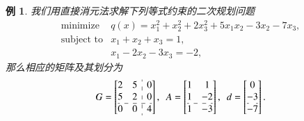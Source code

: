 \documentclass{SBCbookchapter}
\newtheorem{eg}[thm]{例}
\begin{document}
\begin{eg}
\label{eg:7.2.1}
我们用直接消元法求解下列等式约束的二次规划问题
\begin{equation*}
\begin{array}{cl}
\text{minimize} & q(x) = x_1^2 + x_2^2 + 2x_3^2 + 5x_1x_2 - 3x_2 - 7x_3, \\
\text{subject to} & x_1 + x_2 + x_3 = 1, \\
& x_1 - 2x_2 - 3x_3 = -2,
\end{array}
\end{equation*}
那么相应的矩阵及其划分为
\begin{equation*}
G = \left[\begin{array}{@{}cc:c@{}} 2 & 5 & 0 \\ 5 & 2 & 0 \\ \hdashline 0 & 0 & 4 \end{array}\right], ~~ A = \left[\begin{array}{@{}cc@{}} 1 & 1 \\ 1 & -2 \\ \hdashline 1 & -3 \end{array}\right], ~~ d = \left[\begin{array}{@{}c@{}} 0 \\ -3 \\ \hdashline -7 \end{array}\right].
\end{equation*}


\end{eg}
\end{document}
